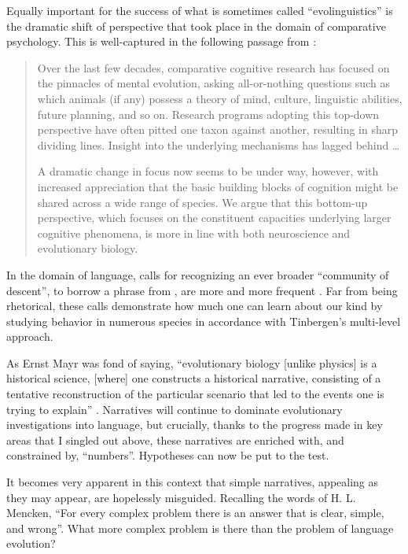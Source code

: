 Equally important for the success of what is sometimes called ``evolinguistics'' is the dramatic shift of perspective that took place in the domain of comparative psychology. This is well-captured in the following passage from \cite{de2010towards}:

\largerpage
\begin{quote}	
Over the last few decades, comparative cognitive research has focused on the pinnacles of mental evolution, asking all-or-nothing questions such as which animals (if any) possess a theory of mind, culture, linguistic abilities, future planning, and so on. Research programs adopting this top-down perspective have often pitted one taxon against another, resulting in sharp dividing lines. Insight into the underlying mechanisms has lagged behind \ldots \clearpage


A dramatic change in focus now seems to be under way, however, with increased appreciation that the basic building blocks of cognition might be shared across a wide range of species. We argue that this bottom-up perspective, which focuses on the constituent capacities underlying larger cognitive phenomena, is more in line with both neuroscience and evolutionary biology.
\end{quote}

In the domain of language, calls for recognizing an ever broader ``community of descent'', to borrow a phrase from \cite{darwindescent}, are more and more frequent \citep{lattenkamp2018vocal}. Far from being rhetorical, these calls demonstrate how much one can learn about our kind by studying behavior in numerous species in accordance with Tinbergen's multi-level approach.

As Ernst Mayr was fond of saying, ``evolutionary biology [unlike physics] is a historical science, [where] one constructs a historical narrative, consisting of a tentative reconstruction of the particular scenario that led to the events one is trying to explain'' \citep{mayr2000darwin}. Narratives will continue to dominate evolutionary investigations into language, but crucially, thanks to the progress made in key areas that I singled out above, these narratives are enriched with, and constrained by, ``numbers''. Hypotheses can now be put to the test.

It becomes very apparent in this context that simple narratives, appealing as they may appear, are hopelessly misguided. Recalling the words of H. L. Mencken, ``For every complex problem there is an answer that is clear, simple, and wrong''. What more complex problem is there than the problem of language evolution?

